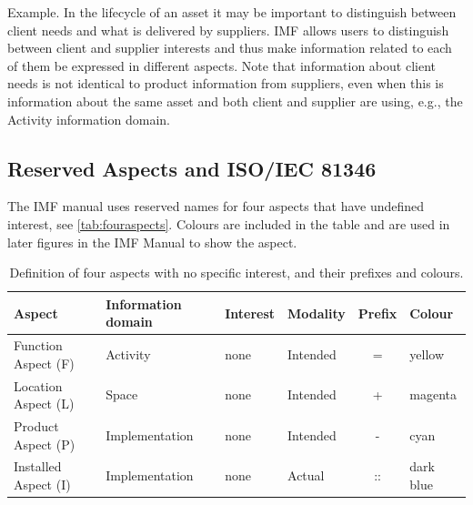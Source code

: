 \documentclass[../main.tex]{subfiles}
\begin{document}
Example. In the lifecycle of an asset it may be important to distinguish between client needs and what is delivered by suppliers. IMF allows users to distinguish between  client and supplier interests and thus make information related to each of them be expressed in different aspects. Note that information about  client needs is not identical to product information from suppliers, even when this is information about the same asset and both client and supplier are using, e.g., the Activity information domain. 

\subsection{Reserved Aspects and ISO/IEC 81346}

The IMF manual uses reserved names for four aspects that have undefined interest, see  \autoref{tab:fouraspects}.
Colours are included in the table and are used in later figures in the IMF Manual to show the aspect. 



\begin{table}[tb]\centering\caption{Definition of  four aspects with no specific interest, and their
    prefixes and colours.}\label{tab:fouraspects}
  \begin{tabular}{l lll c l}
    \toprule
\textbf{Aspect}  & \textbf{Information domain} & \textbf{Interest} & \textbf{Modality} &  \textbf{Prefix}  & \textbf{Colour} \\ \midrule
Function Aspect (F) &  Activity &none& Intended  &  =  &  yellow \\ 
Location Aspect (L)  & Space&none& Intended  & +  & magenta \\ 
Product Aspect (P) &  Implementation & none& Intended &  - &  cyan \\ 
Installed Aspect (I)  & Implementation&  none & Actual  & ::  &  dark blue\\
\bottomrule
  \end{tabular}
\end{table}
\end{document}
